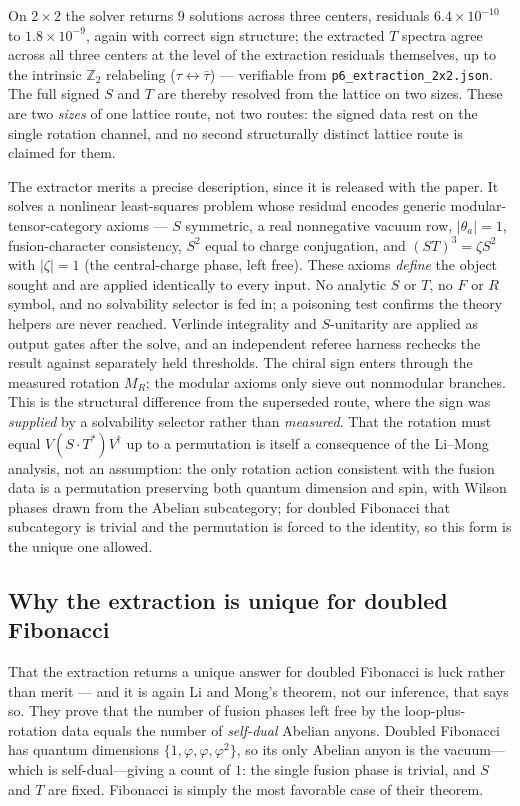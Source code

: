 \documentclass[aps,pra,twocolumn,superscriptaddress,longbibliography,floatfix,nofootinbib]{revtex4-2}
\begin{document}
On $2\times2$ the solver returns $9$ solutions across three centers, residuals
$6.4\times10^{-10}$ to $1.8\times10^{-9}$, again with correct sign structure; the extracted $T$ spectra agree across all
three centers at the level of the extraction residuals themselves, up to the
intrinsic $\mathbb{Z}_2$ relabeling ($\tau\leftrightarrow\bar\tau$) --- verifiable
from \texttt{p6\_extraction\_2x2.json}. The full signed $S$ and $T$ are thereby resolved from
the lattice on two sizes. These are two \emph{sizes} of one lattice route, not
two routes: the signed data rest on the single rotation channel, and no second
structurally distinct lattice route is claimed for them.

The extractor merits a precise description, since it is released with the
paper. It solves a nonlinear least-squares problem whose residual encodes
generic modular-tensor-category axioms --- $S$ symmetric, a real nonnegative
vacuum row, $|\theta_a|=1$, fusion-character consistency, $S^{2}$ equal to
charge conjugation, and $(ST)^{3}=\zeta S^{2}$ with $|\zeta|=1$ (the
central-charge phase, left free). These axioms \emph{define} the object sought
and are applied identically to every input. No analytic $S$ or $T$, no $F$ or
$R$ symbol, and no solvability selector is fed in; a poisoning test confirms the
theory helpers are never reached. Verlinde integrality and $S$-unitarity are
applied as output gates after the solve, and an independent referee harness
rechecks the result against separately held thresholds. The chiral sign enters
through the measured rotation $M_R$; the modular axioms only sieve out
nonmodular branches. This is the structural difference from the superseded
route, where the sign was \emph{supplied} by a solvability selector rather than
\emph{measured}. That the rotation must equal $V(S\cdot T^{*})V^{\dagger}$ up to
a permutation is itself a consequence of the Li--Mong analysis, not an
assumption: the only rotation action consistent with the fusion data is a
permutation preserving both quantum dimension and spin, with Wilson phases
drawn from the Abelian subcategory; for doubled Fibonacci that subcategory is
trivial and the permutation is forced to the identity, so this form is the
unique one allowed.

\subsection{Why the extraction is unique for doubled Fibonacci}
\label{sec:unique}

That the extraction returns a unique answer for doubled Fibonacci is luck
rather than merit --- and it is again Li and Mong's theorem, not our inference,
that says so. They prove that the number of fusion phases left free by the
loop-plus-rotation data equals the number of \emph{self-dual} Abelian anyons.
Doubled Fibonacci has quantum dimensions $\{1,\varphi,\varphi,\varphi^{2}\}$, so
its only Abelian anyon is the vacuum---which is self-dual---giving a count of
$1$: the single fusion phase is trivial, and $S$ and $T$ are fixed. Fibonacci is simply the most favorable
case of their theorem.
\end{document}
